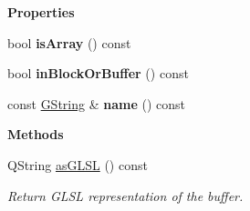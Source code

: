 \begin{Indent}\textbf{ Properties}\par
\begin{DoxyCompactItemize}
\item 
\mbox{\label{structrev_1_1_shader_input_info_a30e338d237bd4ac2c2001e671f78a27d}} 
bool {\bfseries is\+Array} () const
\item 
\mbox{\label{structrev_1_1_shader_input_info_a73384310db7397a3cc53daaec2545354}} 
bool {\bfseries in\+Block\+Or\+Buffer} () const
\item 
\mbox{\label{structrev_1_1_shader_input_info_a0546fc959db5cfe499b47c3563eae3b6}} 
const \mbox{\hyperlink{classrev_1_1_g_string}{G\+String}} \& {\bfseries name} () const
\end{DoxyCompactItemize}
\end{Indent}
\begin{Indent}\textbf{ Methods}\par
\begin{DoxyCompactItemize}
\item 
\mbox{\label{structrev_1_1_shader_input_info_ab803505bdea37d9a7353a923c3b747a7}} 
Q\+String \mbox{\hyperlink{structrev_1_1_shader_input_info_ab803505bdea37d9a7353a923c3b747a7}{as\+G\+L\+SL}} () const
\begin{DoxyCompactList}\small\item\em Return G\+L\+SL representation of the buffer. \end{DoxyCompactList}\end{DoxyCompactItemize}
\end{Indent}
